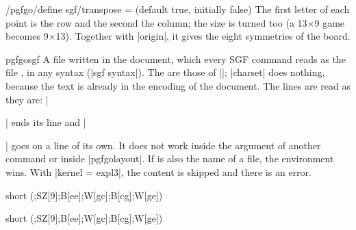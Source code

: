 \begin{key}{/pgfgo/define sgf/transpose =  (default true, initially false)}
	The first letter of each point is the row and the second the column; the size is turned too (a 13$\times$9 game becomes 9$\times$13). Together with |origin|, it gives the eight symmetries of the board.

	\begin{codeexample}[]

		\begin{goban}[sgf size = mirror, scale = 0.4]
		\end{goban}
		\begin{goban}[sgf size = transposed, scale = 0.4]
		\end{goban}
	\end{codeexample}
\end{key}

\begin{environment}{{pgfgosgf}}
	A file written in the document, which every SGF command reads as the file , in any syntax (|sgf syntax|). The  are those of |\pgfgodefinesgf|; |charset| does nothing, because the text is already in the encoding of the document. The lines are read as they are: |\begin{pgfgosgf}| ends its line and |\end{pgfgosgf}| goes on a line of its own. It does not work inside the argument of another command or inside |pgfgolayout|. If  is also the name of a file, the environment wins. With |kernel = expl3|, the content is skipped and there is an error.

	\begin{codeexample}
\begin{pgfgosgf}{short}
(;SZ[9];B[ee];W[gc];B[cg];W[ge])
\end{pgfgosgf}

\begin{goban}[sgf size = short, scale = 0.4]
\end{goban}
	\end{codeexample}

\begin{pgfgosgf}{short}
(;SZ[9];B[ee];W[gc];B[cg];W[ge])
\end{pgfgosgf}

\begin{goban}[sgf size = short, scale = 0.4]
\end{goban}
\end{environment}

